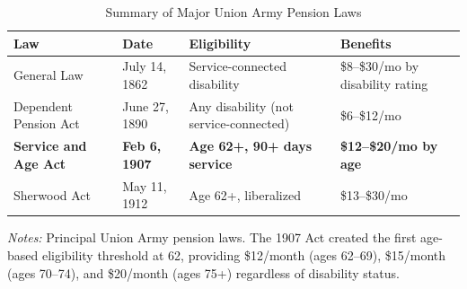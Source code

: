 \begin{table}[htbp]
\centering
\caption{Summary of Major Union Army Pension Laws}
\label{tab:pension_laws}
\begin{tabular}{lp{3cm}p{4cm}p{4cm}}
\toprule
  Law & Date & Eligibility & Benefits \\
\midrule
  General Law & July 14, 1862 & Service-connected disability & \$8--\$30/mo by disability rating \\
  Dependent Pension Act & June 27, 1890 & Any disability (not service-connected) & \$6--\$12/mo \\
  \textbf{Service and Age Act} & \textbf{Feb 6, 1907} & \textbf{Age 62+, 90+ days service} & \textbf{\$12--\$20/mo by age} \\
  Sherwood Act & May 11, 1912 & Age 62+, liberalized & \$13--\$30/mo \\
\bottomrule
\end{tabular}
\begin{tablenotes}[flushleft]
\small
\item \textit{Notes:} Principal Union Army pension laws. The 1907 Act created the first age-based eligibility threshold at 62, providing \$12/month (ages 62--69), \$15/month (ages 70--74), and \$20/month (ages 75+) regardless of disability status.
\end{tablenotes}
\end{table}
